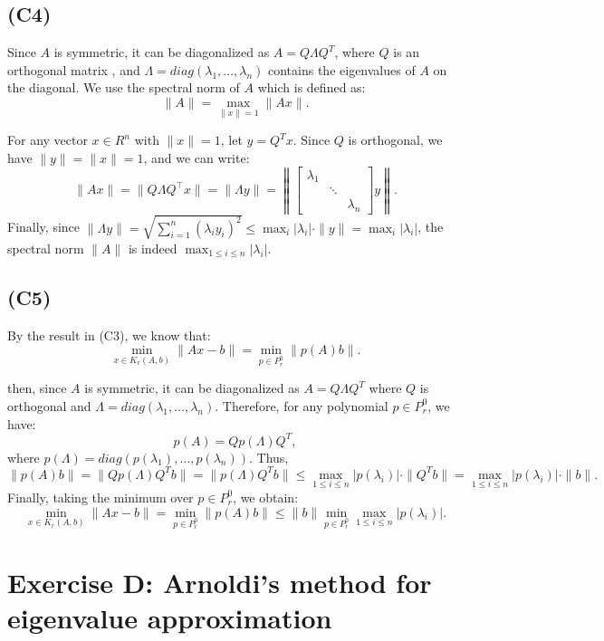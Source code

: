 \documentclass{article}
\begin{document}
\subsection*{(C4)}
Since $ A $ is symmetric, it can be diagonalized as $ A = Q \Lambda Q^T $, 
where $ Q $ is an orthogonal matrix , and $ \Lambda = diag(\lambda_1, \dots, \lambda_n) $ contains the eigenvalues of $ A $ on the diagonal.
We use the spectral norm of $ A $ which is defined as:
   \[
   \|A\| = \max_{\|x\| = 1} \|Ax\|.
   \]

For any vector $ x \in R^n $ with $ \|x\| = 1 $, let $ y = Q^T x $. 
Since $ Q $ is orthogonal, we have $ \|y\| = \|x\| = 1 $, and we can write:
 \[
\|Ax\| = \|Q \Lambda Q^\top x\| = \|\Lambda y\| = \left\|
   [\begin{array}{ccc}
        \lambda_1 & &  \\
         & \ddots &  \\
         & & \lambda_n 
    \end{array} ] y\right \|.
\]
Finally, since $ \|\Lambda y\| = \sqrt{\sum_{i=1}^n (\lambda_i y_i)^2} \leq \max_{i} |\lambda_i| \cdot \|y\| = \max_{i} |\lambda_i| $, the spectral norm $ \|A\| $ is indeed $ \max_{1 \leq i \leq n} |\lambda_i| $.

\subsection*{(C5)}
By the result in (C3), we know that:
   \[
   \min_{x \in K_r(A, b)} \|Ax - b\| = \min_{p \in P_r^0} \|p(A)b\|.
   \]

then, since $ A $ is symmetric, it can be diagonalized as $ A = Q\Lambda Q^T$ where $ Q $ is orthogonal and $ \Lambda = diag(\lambda_1, \dots, \lambda_n) $.
Therefore, for any polynomial $ p \in P_r^0 $, we have:
   \[
   p(A) = Q p(\Lambda) Q^T,
   \]
   where $ p(\Lambda) = diag(p(\lambda_1), \dots, p(\lambda_n)) $.
 Thus,
   \[
   \|p(A) b\| = \|Q p(\Lambda) Q^T b\| = \|p(\Lambda) Q^T b\| \leq \max_{1 \leq i \leq n} |p(\lambda_i)| \cdot \|Q^T b\| = \max_{1 \leq i \leq n} |p(\lambda_i)| \cdot \|b\|.
   \]
Finally, taking the minimum over $ p \in P_r^0 $, we obtain:
   \[
   \min_{x \in K_r(A, b)} \|Ax - b\| = \min_{p \in P_r^0} \|p(A) b\| \leq \|b\| \min_{p \in P_r^0} \max_{1 \leq i \leq n} |p(\lambda_i)|.
   \]

\section{Exercise D: Arnoldi’s method for eigenvalue approximation}
\end{document}
